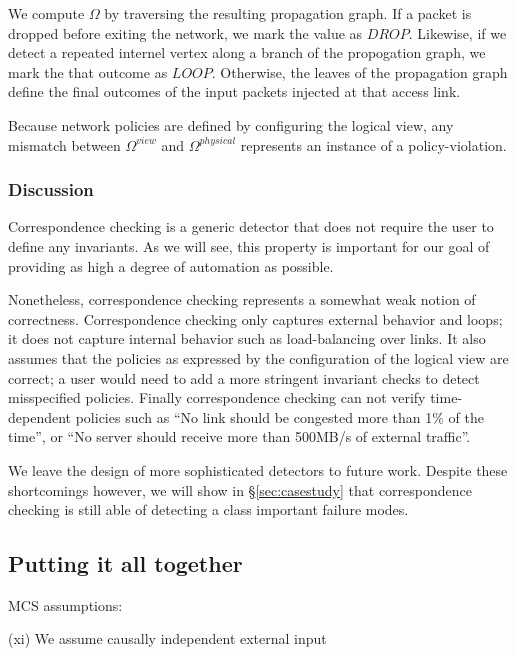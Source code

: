 We compute $\Omega$ by traversing the resulting propagation graph. If a packet
is dropped before exiting the network, we mark the value as $DROP$. Likewise,
if we detect a repeated internel vertex along a branch of the propogation graph, we mark the
that outcome as $LOOP$. Otherwise, 
the leaves of the propagation graph define the final outcomes of the input
packets injected at that access link.

Because network policies are defined by
configuring the logical view, any mismatch between $\Omega^{view}$ and $\Omega^{physical}$
represents an instance of a policy-violation.

\subsubsection{Discussion}

Correspondence checking is a generic detector that does not require the user
to define any invariants. As we will see, this property is important for our
goal of providing as high a degree of automation as possible.

Nonetheless, correspondence checking represents a somewhat weak notion of
correctness. Correspondence checking only captures external behavior and
loops; it does not capture internal behavior such as load-balancing
over links. It also assumes that the policies as expressed by the
configuration of the logical view are correct; a user would need to add a more 
stringent invariant checks to detect misspecified policies.
Finally correspondence checking can not verify
time-dependent policies such as ``No link should be congested more than 1\% of
the time'', or ``No server should receive more than 500MB/s of external traffic''.

We leave the design of more sophisticated detectors to future work.
Despite these shortcomings however, we will show in 
\S\ref{sec:casestudy} that correspondence checking is still able of
detecting a class important failure modes.


\subsection{Putting it all together}
                                                                                           
MCS assumptions:

(xi) We assume causally independent external input

